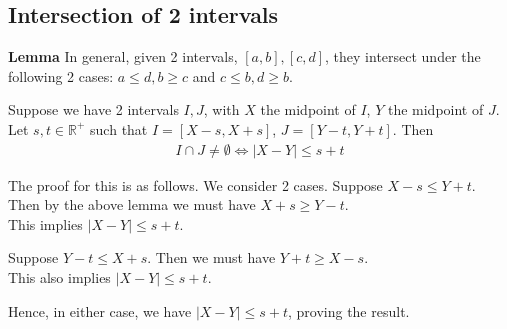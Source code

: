 \documentclass{article}
\begin{document}
\subsection{Intersection of 2 intervals}
\textbf{Lemma} In general, given 2 intervals, $[a,b],[c,d]$, they intersect under the following 2 cases:
$a \leq d, b \geq c$ and $c\leq b, d\geq b$.


Suppose we have 2 intervals $I,J$, with $X$ the midpoint of $I$, $Y$ the midpoint of $J$. Let $s,t\in \mathbb{R}^+$ such that $I=[X-s,X+s]$, $J=[Y-t,Y+t]$. Then 
\begin{align*}
	I\cap J\neq \emptyset \iff |X-Y| \leq s+t
\end{align*}

The proof for this is as follows. We consider 2 cases.
Suppose $X-s \leq Y+t$. Then by the above lemma we must have $X+s\geq  Y-t$.\\
This implies $|X-Y|\leq s+t$.


Suppose $Y-t \leq X+s$. Then we must have $Y+t\geq X-s$.\\
This also implies $|X-Y|\leq s+t$.

Hence, in either case, we have $|X-Y|\leq s+t$, proving the result.
\end{document}
